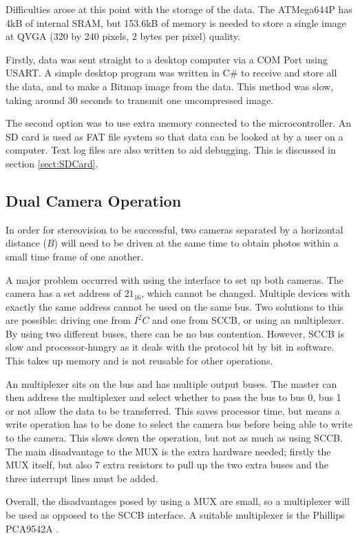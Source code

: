 Difficulties arose at this point with the storage of the data. The ATMega644P has 4kB of internal SRAM, but  153.6kB of memory is needed to store a single image at QVGA (320 by 240 pixels, 2 bytes per pixel) quality. 

Firstly, data was sent straight to a desktop computer via a COM Port using USART. A simple desktop program was written in C\# to receive and store all the data, and to make a Bitmap image from the data. This method was slow, taking around 30 seconds to transmit one uncompressed image. 

The second option was to use extra memory connected to the microcontroller. An SD card is used as FAT file system so that data can be looked at by a user on a computer. Text log files are also written to aid debugging. This is discussed in section \ref{sect:SDCard}. 

\subsection{Dual Camera Operation}
In order for stereovision to be successful, two cameras separated by a horizontal distance ($B$) will need to be driven at the same time to obtain photos within a small time frame of one another.

A major problem occurred with using the \itc interface to set up both cameras. The camera has a set \itc address of $21_{16}$, which cannot be changed. Multiple \itc devices with exactly the same address cannot be used on the same bus. 
Two solutions to this are possible: driving one from $I^{2}C$ and one from SCCB, or using an \itc multiplexer. By using two different buses, there can be no bus contention. However, SCCB is slow and processor-hungry as it deals with the protocol bit by bit in software. This takes up memory and is not reusable for other operations.

An \itc multiplexer sits on the bus and has multiple output buses. The master can then address the multiplexer and select whether to pass the bus to bus 0, bus 1 or not allow the data to be transferred. This saves processor time, but means a write operation has to be done to select the camera bus before being able to write to the camera. This slows down the operation, but not as much as using SCCB. The main disadvantage to the \itc MUX is the extra hardware needed; firstly the MUX itself, but also 7 extra resistors to pull up the two extra buses and the three interrupt lines must be added. 

Overall, the disadvantages posed by using a MUX are small, so a multiplexer will be used as opposed to the SCCB interface. A suitable multiplexer is the Phillips PCA9542A \citep{I2C_Mux}.

